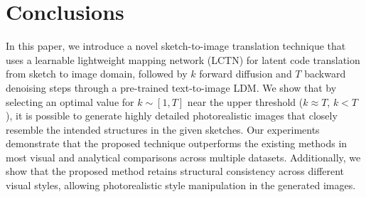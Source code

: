\section{Conclusions}
\label{sec:conclusions}

In this paper, we introduce a novel sketch-to-image translation technique that uses a learnable lightweight mapping network (LCTN) for latent code translation from sketch to image domain, followed by $k$ forward diffusion and $T$ backward denoising steps through a pre-trained text-to-image LDM. We show that by selecting an optimal value for $k \sim [1, T]$ near the upper threshold ($k \approx T$, $k < T$), it is possible to generate highly detailed photorealistic images that closely resemble the intended structures in the given sketches. Our experiments demonstrate that the proposed technique outperforms the existing methods in most visual and analytical comparisons across multiple datasets. Additionally, we show that the proposed method retains structural consistency across different visual styles, allowing photorealistic style manipulation in the generated images.
